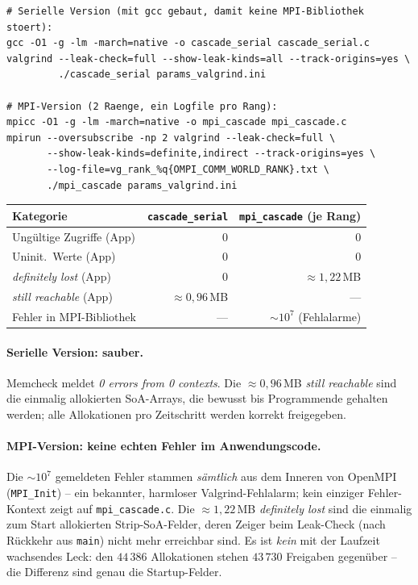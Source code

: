\documentclass[11pt,a4paper]{article}
\begin{document}
\begin{lstlisting}[basicstyle=\ttfamily\footnotesize, breaklines=true]
# Serielle Version (mit gcc gebaut, damit keine MPI-Bibliothek stoert):
gcc -O1 -g -lm -march=native -o cascade_serial cascade_serial.c
valgrind --leak-check=full --show-leak-kinds=all --track-origins=yes \
         ./cascade_serial params_valgrind.ini

# MPI-Version (2 Raenge, ein Logfile pro Rang):
mpicc -O1 -g -lm -march=native -o mpi_cascade mpi_cascade.c
mpirun --oversubscribe -np 2 valgrind --leak-check=full \
       --show-leak-kinds=definite,indirect --track-origins=yes \
       --log-file=vg_rank_%q{OMPI_COMM_WORLD_RANK}.txt \
       ./mpi_cascade params_valgrind.ini
\end{lstlisting}

\begin{center}\small
\begin{tabular}{@{}lrr@{}}
\toprule
Kategorie & \texttt{cascade\_serial} & \texttt{mpi\_cascade} (je Rang) \\
\midrule
Ungültige Zugriffe (App) & 0 & 0 \\
Uninit.\ Werte (App)     & 0 & 0 \\
\emph{definitely lost} (App) & 0 & $\approx 1{,}22$\,MB \\
\emph{still reachable} (App) & $\approx 0{,}96$\,MB & --- \\
Fehler in MPI-Bibliothek & --- & $\sim 10^7$ (Fehlalarme) \\
\bottomrule
\end{tabular}
\end{center}

\paragraph{Serielle Version: sauber.} Memcheck meldet
\emph{0 errors from 0 contexts}. Die $\approx 0{,}96$\,MB \emph{still reachable}
sind die einmalig allokierten SoA-Arrays, die bewusst bis Programmende gehalten
werden; alle Allokationen pro Zeitschritt werden korrekt freigegeben.

\paragraph{MPI-Version: keine echten Fehler im Anwendungscode.} Die $\sim 10^7$
gemeldeten Fehler stammen \emph{sämtlich} aus dem Inneren von OpenMPI
(\texttt{MPI\_Init}) -- ein bekannter, harmloser Valgrind-Fehlalarm; kein
einziger Fehler-Kontext zeigt auf \texttt{mpi\_cascade.c}. Die
$\approx 1{,}22$\,MB \emph{definitely lost} sind die einmalig zum Start
allokierten Strip-SoA-Felder, deren Zeiger beim Leak-Check (nach Rückkehr aus
\texttt{main}) nicht mehr erreichbar sind. Es ist \emph{kein} mit der Laufzeit
wachsendes Leck: den $44\,386$ Allokationen stehen $43\,730$ Freigaben
gegenüber -- die Differenz sind genau die Startup-Felder.
\end{document}
